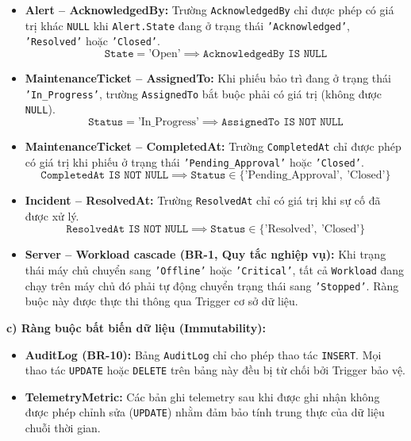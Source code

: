 \begin{itemize}[leftmargin=2em]
    \item \textbf{Alert -- AcknowledgedBy:} Trường \texttt{AcknowledgedBy} chỉ được phép có giá trị khác \texttt{NULL} khi \texttt{Alert.State} đang ở trạng thái \texttt{'Acknowledged'}, \texttt{'Resolved'} hoặc \texttt{'Closed'}.
    \[
    \texttt{State} = \text{'Open'} \implies \texttt{AcknowledgedBy IS NULL}
    \]
    
    \item \textbf{MaintenanceTicket -- AssignedTo:} Khi phiếu bảo trì đang ở trạng thái \texttt{'In\_Progress'}, trường \texttt{AssignedTo} bắt buộc phải có giá trị (không được \texttt{NULL}).
    \[
    \texttt{Status} = \text{'In\_Progress'} \implies \texttt{AssignedTo IS NOT NULL}
    \]
    
    \item \textbf{MaintenanceTicket -- CompletedAt:} Trường \texttt{CompletedAt} chỉ được phép có giá trị khi phiếu ở trạng thái \texttt{'Pending\_Approval'} hoặc \texttt{'Closed'}.
    \[
    \texttt{CompletedAt IS NOT NULL} \implies \texttt{Status} \in \{\text{'Pending\_Approval'},\ \text{'Closed'}\}
    \]
    
    \item \textbf{Incident -- ResolvedAt:} Trường \texttt{ResolvedAt} chỉ có giá trị khi sự cố đã được xử lý.
    \[
    \texttt{ResolvedAt IS NOT NULL} \implies \texttt{Status} \in \{\text{'Resolved'},\ \text{'Closed'}\}
    \]
    
    \item \textbf{Server -- Workload cascade (BR-1, Quy tắc nghiệp vụ):} Khi trạng thái máy chủ chuyển sang \texttt{'Offline'} hoặc \texttt{'Critical'}, tất cả \texttt{Workload} đang chạy trên máy chủ đó phải tự động chuyển trạng thái sang \texttt{'Stopped'}. Ràng buộc này được thực thi thông qua Trigger cơ sở dữ liệu.
\end{itemize}

\vspace{0.5em}
\noindent\textbf{c) Ràng buộc bất biến dữ liệu (Immutability):}

\begin{itemize}[leftmargin=2em]
    \item \textbf{AuditLog (BR-10):} Bảng \texttt{AuditLog} chỉ cho phép thao tác \texttt{INSERT}. Mọi thao tác \texttt{UPDATE} hoặc \texttt{DELETE} trên bảng này đều bị từ chối bởi Trigger bảo vệ.
    \item \textbf{TelemetryMetric:} Các bản ghi telemetry sau khi được ghi nhận không được phép chỉnh sửa (\texttt{UPDATE}) nhằm đảm bảo tính trung thực của dữ liệu chuỗi thời gian.
\end{itemize}

